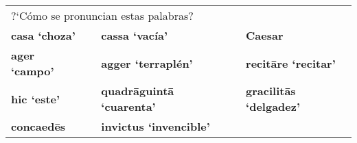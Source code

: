 \documentclass[convert={density=300,size=1080x800,outext=.png}]{standalone}
\begin{document}
{\Huge{
\begin{tabular}{lllll}

\multicolumn{3}{l}{?`C\'omo se pronuncian estas palabras?} & \\ [2ex]
\textbf{casa `choza'}  & & \textbf{cassa `vacía'}                   & & \textbf{Caesar}                \\
\textbf{ager `campo'}  & & \textbf{agger `terrapl\'en'}             & & \textbf{recit\={a}re `recitar'}    \\
\textbf{hic `este'}    & & \textbf{quadr\={a}guint\={a} `cuarenta'} & & \textbf{gracilit\={a}s `delgadez'} \\
\textbf{concaed\={e}s} & & \textbf{invictus `invencible'}           & & \\
\end{tabular}
}}
\end{document}
